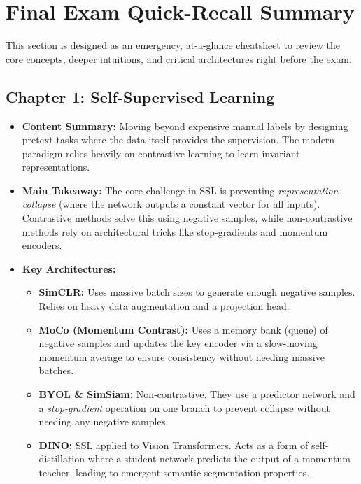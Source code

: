 \chapter*{Final Exam Quick-Recall Summary}
\label{ch:exam_cheatsheet}

This section is designed as an emergency, at-a-glance cheatsheet to review the core concepts, deeper intuitions, and critical architectures right before the exam. 

\section*{Chapter 1: Self-Supervised Learning}
\begin{itemize}
    \item \textbf{Content Summary:} Moving beyond expensive manual labels by designing pretext tasks where the data itself provides the supervision. The modern paradigm relies heavily on contrastive learning to learn invariant representations.
    \item \textbf{Main Takeaway:} The core challenge in SSL is preventing \textit{representation collapse} (where the network outputs a constant vector for all inputs). Contrastive methods solve this using negative samples, while non-contrastive methods rely on architectural tricks like stop-gradients and momentum encoders.
    \item \textbf{Key Architectures:}
    \begin{itemize}
        \item \textbf{SimCLR:} Uses massive batch sizes to generate enough negative samples. Relies on heavy data augmentation and a projection head.
        \item \textbf{MoCo (Momentum Contrast):} Uses a memory bank (queue) of negative samples and updates the key encoder via a slow-moving momentum average to ensure consistency without needing massive batches.
        \item \textbf{BYOL \& SimSiam:} Non-contrastive. They use a predictor network and a \textit{stop-gradient} operation on one branch to prevent collapse without needing any negative samples.
        \item \textbf{DINO:} SSL applied to Vision Transformers. Acts as a form of self-distillation where a student network predicts the output of a momentum teacher, leading to emergent semantic segmentation properties.
    \end{itemize}
\end{itemize}

